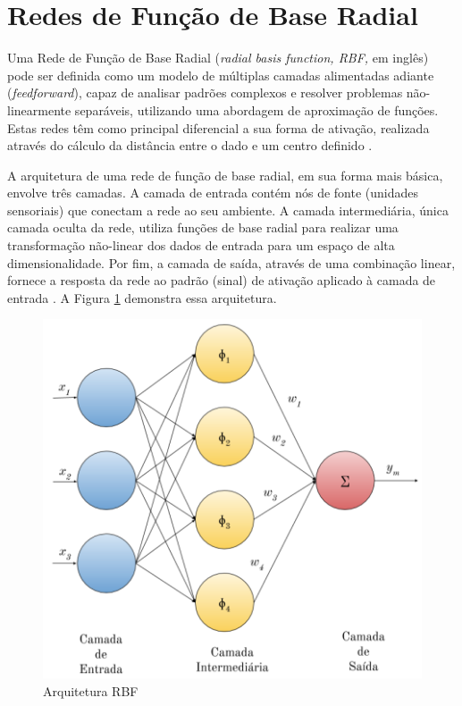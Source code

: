 \documentclass[qual, classic, a4paper]{ufbathesis}
\begin{document}
\section{Redes de Função de Base Radial}

Uma Rede de Função de Base Radial (\textit{radial basis function, RBF,} em inglês) pode ser definida como um modelo de múltiplas camadas alimentadas adiante (\textit{feedforward}), 
capaz de analisar padrões complexos e resolver problemas não-linearmente separáveis, utilizando uma abordagem de aproximação de funções.
Estas redes têm como principal diferencial a sua forma de ativação, realizada através do cálculo da distância entre o dado e um centro definido \cite{Braga:RedesNeuraisTeoriaAplicacoes}.

A arquitetura de uma rede de função de base radial, em sua forma mais básica, envolve três camadas.
A camada de entrada contém nós de fonte (unidades sensoriais) que conectam a rede ao seu ambiente.
A camada intermediária, única camada oculta da rede, 
utiliza funções de base radial para realizar uma transformação não-linear dos dados de entrada para um espaço de alta dimensionalidade.
Por fim, a camada de saída, através de uma combinação linear, fornece a resposta da rede ao padrão (sinal) de ativação aplicado à camada de entrada \cite{Rojas:1996:NNS:235222}. 
A Figura \ref{fig:rbg_arq} demonstra essa arquitetura.

\begin{figure}[H]
\begin{center}
    \includegraphics[scale=1]{imagens/rbf_arq.png}
    \caption{Arquitetura RBF}
    \label{fig:rbg_arq}
\end{center}
\end{figure}
\end{document}
